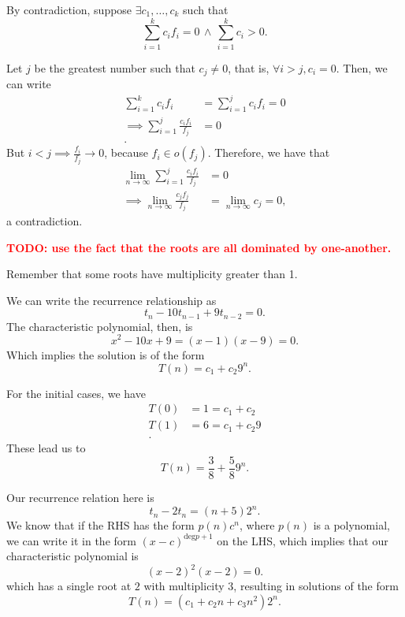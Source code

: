 

By contradiction, suppose $\exists c_1,\ldots,c_k$ such that \[
\sum_{i=1}^{k} c_i f_i = 0 \,\land\, \sum_{i=1}^{k} c_i > 0
.\] 

Let $j$ be the greatest number such that $c_j\neq 0$, that is, $\forall i>j, c_i=0$.
Then, we can write
\begin{align*}
    \sum_{i=1}^{k} c_i f_i &= \sum_{i=1}^{j} c_i f_i = 0 \\
    \implies \sum_{i=1}^{j} \frac{c_i f_i}{f_j} &= 0 \\
.\end{align*}
But $i<j \implies\frac{f_i}{f_j} \to 0$, because $f_i\in o(f_j)$.
Therefore, we have that 
\begin{align*}
    \lim_{n \to \infty} \sum_{i=1}^{j} \frac{c_i f_i}{f_j} &= 0 \\
    \implies \lim_{n \to \infty} \frac{c_j f_j}{f_j} &= \lim_{n \to \infty} c_j = 0
,\end{align*}
a contradiction.


\textbf{\textcolor{red}{TODO: use the fact that the roots are all dominated by one-another.}}

Remember that some roots have multiplicity greater than 1.




We can write the recurrence relationship as \[
t_n - 10t_{n-1} + 9t_{n-2} = 0
.\] The characteristic polynomial, then, is \[
x^{2} - 10x + 9 = (x-1)(x-9) = 0
.\] Which implies the solution is of the form \[
T(n) = c_1 + c_2 9^{n}
.\] 

For the initial cases, we have
\begin{align*}
    T(0) &= 1 = c_1 + c_2 \\
    T(1) &= 6 = c_1 + c_2 9 \\
.\end{align*}
These lead us to \[
T(n) = \frac{3}{8} + \frac{5}{8} 9^{n}
.\] 


Our recurrence relation here is \[
t_n - 2 t_n = (n +5) 2^{n}
.\] 
We know that if the RHS has the form $p(n) c^{n}$, where $p(n)$ is a polynomial, we can write it in the form $(x-c)^{\text{deg} p + 1}$ on the LHS, which implies that our characteristic polynomial is \[
    (x-2)^{2} (x-2) = 0
.\] which has a single root at $2$ with multiplicity 3, resulting in solutions of the form \[
T(n) = \left( c_1 + c_2n + c_3 n^{2} \right)2^{n}
.\] 

